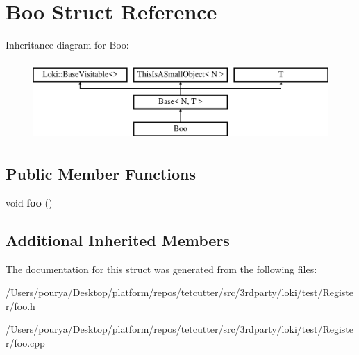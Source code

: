 \hypertarget{structBoo}{}\section{Boo Struct Reference}
\label{structBoo}
Inheritance diagram for Boo\+:\begin{figure}[H]
\begin{center}
\leavevmode
\includegraphics[height=3.000000cm]{structBoo}
\end{center}
\end{figure}
\subsection*{Public Member Functions}
\begin{DoxyCompactItemize}
\item 
\hypertarget{structBoo_acb2146c90720b1f1c7ea2b061df53ffe}{}void {\bfseries foo} ()\label{structBoo_acb2146c90720b1f1c7ea2b061df53ffe}

\end{DoxyCompactItemize}
\subsection*{Additional Inherited Members}


The documentation for this struct was generated from the following files\+:\begin{DoxyCompactItemize}
\item 
/\+Users/pourya/\+Desktop/platform/repos/tetcutter/src/3rdparty/loki/test/\+Register/foo.\+h\item 
/\+Users/pourya/\+Desktop/platform/repos/tetcutter/src/3rdparty/loki/test/\+Register/foo.\+cpp\end{DoxyCompactItemize}
